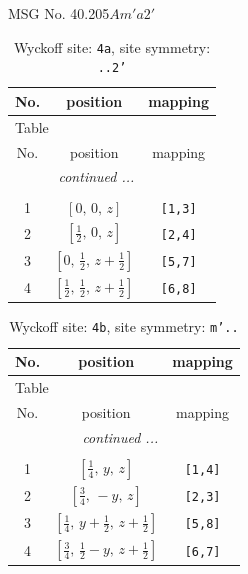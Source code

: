 \documentclass[fleqn,8pt]{jsarticle}
\begin{document}
\setcounter{MaxMatrixCols}{32}

\renewcommand{\tablename}{Table~}
\renewcommand{\figurename}{Figure~}
\begin{center}
\LARGE
MSG No. 40.205\quad$Am'a2'$
\end{center}
\renewcommand{\arraystretch}{1.2}
\begin{longtable}{ccc}
\caption{Wyckoff site: {\tt 4a}, site symmetry: {\tt ..2'}}
 \\
 \hline \hline
No. & position & mapping \\ \hline \endfirsthead

\multicolumn{2}{l}{\tablename\ \thetable{}} \\
 \hline \hline
No. & position & mapping \\ \hline \endhead

 \hline \hline
\multicolumn{2}{r}{\footnotesize\it continued ...} \\ \endfoot

 \hline \hline
\multicolumn{2}{r}{} \\ \endlastfoot

1 & $\left[ 0,\, 0,\, z \right]$ & {\tt [1,3]} \\ \hline
2 & $\left[ \frac{1}{2},\, 0,\, z \right]$ & {\tt [2,4]} \\ \hline
3 & $\left[ 0,\, \frac{1}{2},\, z + \frac{1}{2} \right]$ & {\tt [5,7]} \\ \hline
4 & $\left[ \frac{1}{2},\, \frac{1}{2},\, z + \frac{1}{2} \right]$ & {\tt [6,8]} \\
\end{longtable}
\renewcommand{\arraystretch}{1.2}
\begin{longtable}{ccc}
\caption{Wyckoff site: {\tt 4b}, site symmetry: {\tt m'..}}
 \\
 \hline \hline
No. & position & mapping \\ \hline \endfirsthead

\multicolumn{2}{l}{\tablename\ \thetable{}} \\
 \hline \hline
No. & position & mapping \\ \hline \endhead

 \hline \hline
\multicolumn{2}{r}{\footnotesize\it continued ...} \\ \endfoot

 \hline \hline
\multicolumn{2}{r}{} \\ \endlastfoot

1 & $\left[ \frac{1}{4},\, y,\, z \right]$ & {\tt [1,4]} \\ \hline
2 & $\left[ \frac{3}{4},\, - y,\, z \right]$ & {\tt [2,3]} \\ \hline
3 & $\left[ \frac{1}{4},\, y + \frac{1}{2},\, z + \frac{1}{2} \right]$ & {\tt [5,8]} \\ \hline
4 & $\left[ \frac{3}{4},\, \frac{1}{2} - y,\, z + \frac{1}{2} \right]$ & {\tt [6,7]} \\
\end{longtable}
\end{document}
